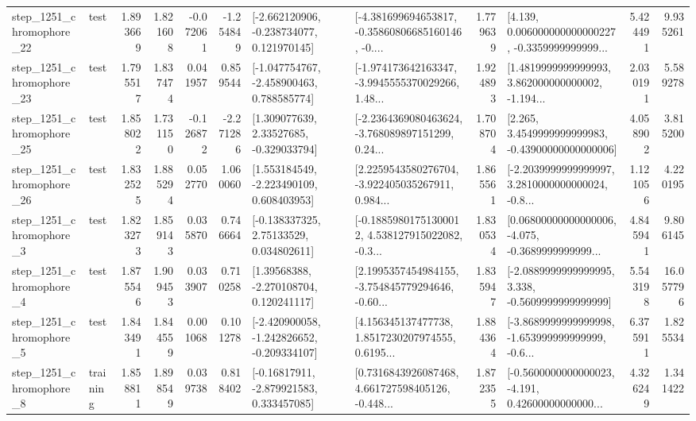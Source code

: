 \begin{tabular}{llrrrrllrlrr}
 step\_1251\_chromophore\_22 &      test &      1.893669 &    1.821608 &     -0.072061 & -1.254849 &   [-2.662120906, -0.238734077, 0.121970145] &  [-4.381699694653817, -0.35860806685160146, -0.... &       1.779639 &  [4.139, 0.006000000000000227, -0.3359999999999... &            5.424491 &          9.935261 \\
 step\_1251\_chromophore\_23 &      test &      1.795517 &    1.837474 &      0.041957 &  0.859544 &   [-1.047754767, -2.458900463, 0.788585774] &  [-1.974173642163347, -3.9945555370029266, 1.48... &       1.924893 &  [1.4819999999999993, 3.862000000000002, -1.194... &            2.030191 &          5.589278 \\
 step\_1251\_chromophore\_25 &      test &      1.858022 &    1.731150 &     -0.126872 & -2.271286 &     [1.309077639, 2.33527685, -0.329033794] &  [-2.2364369080463624, -3.768089897151299, 0.24... &       1.708704 &  [2.265, 3.4549999999999983, -0.43900000000000006] &            4.058902 &          3.815200 \\
 step\_1251\_chromophore\_26 &      test &      1.832525 &    1.885294 &      0.052770 &  1.060060 &    [1.553184549, -2.223490109, 0.608403953] &  [2.2259543580276704, -3.922405035267911, 0.984... &       1.865561 &  [-2.2039999999999997, 3.2810000000000024, -0.8... &            1.121056 &          4.220195 \\
  step\_1251\_chromophore\_3 &      test &      1.823273 &    1.859143 &      0.035870 &  0.746664 &     [-0.138337325, 2.75133529, 0.034802611] &  [-0.18859801751300012, 4.538127915022082, -0.3... &       1.830534 &  [0.06800000000000006, -4.075, -0.3689999999999... &            4.845941 &          9.806145 \\
  step\_1251\_chromophore\_4 &      test &      1.875546 &    1.909453 &      0.033907 &  0.710258 &     [1.39568388, -2.270108704, 0.120241117] &  [2.1995357454984155, -3.754845779294646, -0.60... &       1.835947 &  [-2.0889999999999995, 3.338, -0.5609999999999999] &            5.543198 &         16.057796 \\
  step\_1251\_chromophore\_5 &      test &      1.843491 &    1.844559 &      0.001068 &  0.101278 &  [-2.420900058, -1.242826652, -0.209334107] &  [4.156345137477738, 1.8517230207974555, 0.6195... &       1.884364 &  [-3.8689999999999998, -1.653999999999999, -0.6... &            6.375911 &          1.825534 \\
  step\_1251\_chromophore\_8 &  training &      1.858811 &    1.898549 &      0.039738 &  0.818402 &    [-0.16817911, -2.879921583, 0.333457085] &  [0.7316843926087468, 4.661727598405126, -0.448... &       1.872355 &  [-0.5600000000000023, -4.191, 0.42600000000000... &            4.326249 &          1.341422 \\

\end{tabular}
